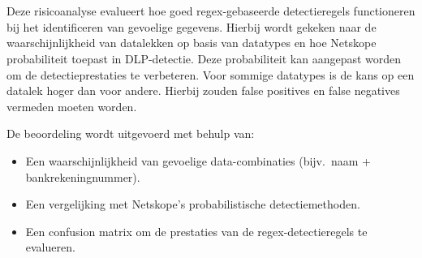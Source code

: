 
\chapter{}
\label{ch:risicoanalyse}

\section{}
\label{sec:inleiding_risicoanalyse}

Deze risicoanalyse evalueert hoe goed regex-gebaseerde detectieregels functioneren bij het identificeren van gevoelige gegevens. 
Hierbij wordt gekeken naar de waarschijnlijkheid van datalekken op basis van datatypes en hoe Netskope probabiliteit toepast in DLP-detectie. 
Deze probabiliteit kan aangepast worden om de detectieprestaties te verbeteren. Voor sommige datatypes is de kans op een datalek hoger dan voor andere. 
Hierbij zouden false positives en false negatives vermeden moeten worden.

De beoordeling wordt uitgevoerd met behulp van:
\begin{itemize}
    \item Een waarschijnlijkheid van gevoelige data-combinaties (bijv.\ naam + bankrekeningnummer).
    \item Een vergelijking met Netskope's probabilistische detectiemethoden.
    \item Een confusion matrix om de prestaties van de regex-detectieregels te evalueren.
\end{itemize}





